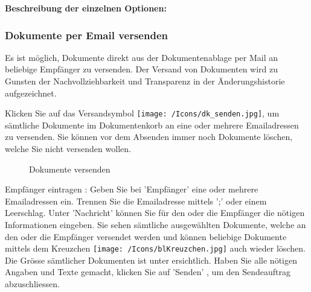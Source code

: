 \vspace{\baselineskip}

\textbf{Beschreibung der einzelnen Optionen:}

\subsubsection{Dokumente per Email versenden}
\label{bkm:Ref201701127}

Es ist möglich, Dokumente direkt aus der Dokumentenablage per Mail an beliebige Empfänger zu versenden. Der Versand von Dokumenten wird zu Gunsten der Nachvollziehbarkeit und Transparenz in der Änderungshistorie aufgezeichnet.

Klicken Sie auf das Versandsymbol \texttt{[image: /Icons/dk\_senden.jpg]}, um sämtliche Dokumente im Dokumentenkorb an eine oder mehrere Emailadressen zu versenden. Sie können vor dem Absenden immer noch Dokumente löschen, welche Sie nicht versenden wollen.

\begin{figure}[H]
\caption{Dokumente versenden}
\end{figure}

Empfänger eintragen : Geben Sie bei 'Empfänger' eine oder mehrere Emailadressen ein. Trennen Sie die Emailadresse mittels ';' oder einem Leerschlag.
Unter 'Nachricht'  können Sie für den oder die Empfänger die nötigen Informationen eingeben. Sie sehen sämtliche ausgewählten Dokumente, welche an den oder die Empfänger versendet werden und können beliebige Dokumente mittels dem Kreuzchen \texttt{[image: /Icons/blKreuzchen.jpg]}  auch wieder löschen. Die Grösse sämtlicher Dokumenten ist unter  ersichtlich. Haben Sie alle nötigen Angaben und Texte gemacht, klicken Sie auf 'Senden' , um den Sendeauftrag abzuschliessen.

\vspace{\baselineskip}

